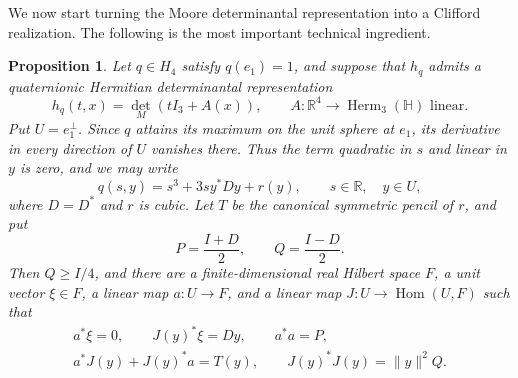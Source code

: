 \documentclass[11pt,onecolumn]{article}
\theoremstyle{blueplain}
\newtheorem{proposition}[proposition]{Proposition}
\theoremstyle{bluedefinition}
\theoremstyle{bluedefinition}
\begin{document}
We now start turning the Moore determinantal representation into a Clifford realization. The following is the most important technical ingredient.

\begin{proposition}
\label{prop:contact-data}
Let $q\in H_4$ satisfy $q(e_1)=1$, and suppose that $h_q$ admits a
quaternionic Hermitian determinantal representation
\[
 h_q(t,x)=\det_M(tI_3+A(x)),\qquad
 A\colon\mathbb R^4\to\operatorname{Herm}_3(\mathbb H)
 \text{ linear}.
\]
Put $U=e_1^\perp$.  Since $q$ attains its maximum on the unit sphere
at $e_1$, its derivative in every direction of $U$ vanishes there.
Thus the term quadratic in $s$ and linear in $y$ is zero, and we may write
\[
 q(s,y)=s^3+3sy^*Dy+r(y),
 \qquad s\in\mathbb R,\quad y\in U,
\]
where $D=D^*$ and $r$ is cubic.  Let $T$ be the canonical symmetric
pencil of $r$, and put
\[
 P=\frac{I+D}{2},\qquad Q=\frac{I-D}{2}.
\]
Then $Q\geqslant I/4$, and there are a finite-dimensional real Hilbert
space $F$, a unit vector $\xi\in F$, a linear map $a\colon U\to F$, and
a linear map $J\colon U\to\operatorname{Hom}(U,F)$ such that
\[
 \begin{gathered}
 a^*\xi=0,\qquad J(y)^*\xi=Dy,\qquad a^*a=P,\\
 a^*J(y)+J(y)^*a=T(y),\qquad
 J(y)^*J(y)=\|y\|^2Q.
 \end{gathered}
\]
\end{proposition}
\end{document}

